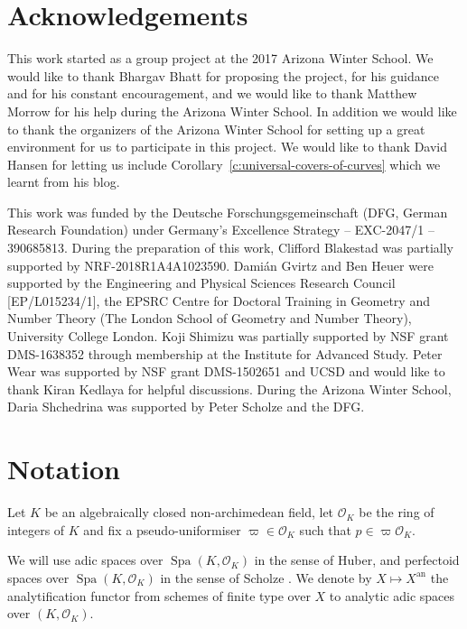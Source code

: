 \documentclass[10pt,oneside]{amsart}
\theoremstyle{definition}
\newcommand{\an}{\mathrm{an}}
\renewcommand{\O}{\mathcal{O}}
\begin{document}
 
 
 \section*{Acknowledgements}
 This work started as a group project at the 2017 Arizona Winter School. We would like to thank Bhargav Bhatt for proposing the project, for his guidance and for his constant encouragement, and we would like to thank Matthew Morrow for his help during the Arizona Winter School. In addition we would like to thank the organizers of the Arizona Winter School for setting up a great environment for us to participate in this project. We would like to thank David Hansen for letting us include Corollary~\ref{c:universal-covers-of-curves} which we learnt from his blog.
 
 This work was funded by the Deutsche Forschungsgemeinschaft (DFG, German Research Foundation) under Germany's Excellence Strategy – EXC-2047/1 – 390685813.
During the preparation of this work, Clifford Blakestad was partially supported by NRF-2018R1A4A1023590.
 Dami\'an Gvirtz and Ben Heuer were supported by the Engineering and Physical Sciences Research Council [EP/L015234/1], the EPSRC Centre for Doctoral Training in Geometry and Number Theory (The London School of Geometry and Number Theory), University College London. Koji Shimizu was partially supported by NSF grant DMS-1638352 through membership at the Institute for Advanced Study.
 Peter Wear was supported by NSF grant DMS-1502651 and UCSD and would like to thank Kiran Kedlaya for helpful discussions. 
 During the Arizona Winter School, Daria Shchedrina was supported by Peter Scholze and the DFG.


\section*{Notation}
	Let $K$ be an algebraically closed non-archimedean field, let $\mathcal O_K$ be the ring of integers of $K$ and fix a pseudo-uniformiser $\varpi\in \mathcal O_K$ such that $p\in\varpi\mathcal O_K$. 
	
	We will use adic spaces over $\operatorname{Spa}(K,\O_K)$ in the sense of Huber, and perfectoid spaces over $\operatorname{Spa}(K,\O_K)$ in the sense of Scholze \cite[\S6]{perfectoid}. We denote by $X\mapsto X^{\an}$ the analytification functor from schemes of finite type over $X$ to analytic adic spaces over $(K,\O_K)$.
	
\end{document}
